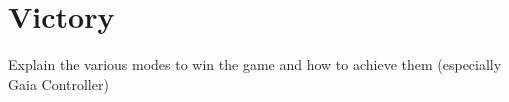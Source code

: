 \chapter{Victory}
Explain the various modes to win the game and how to achieve them (especially
Gaia Controller)

